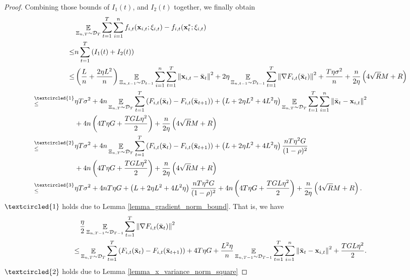 \documentclass{article}
\begin{document}
\begin{proof}
 
Combining those bounds of $I_1(t)$, and $I_2(t)$ together, we finally obtain
\begin{align}
\nonumber
& \EE_{ \Xi_{n,T} \sim \Dcal_{T} } \sum_{t=1}^T\sum_{i=1}^n f_{i,t}(\x_{i,t};\xi_{i,t}) - f_{i,t}(\x_t^\ast;\xi_{i,t}) \\ \nonumber
\le & n \sum_{t=1}^T \lrincir{ I_1(t) + I_2(t) } \\ \nonumber
\le & \lrincir{ \frac{L}{n} + \frac{2\eta L^2}{n} }\EE_{ \Xi_{n,t-1} \sim \Dcal_{t-1} }\sum_{i=1}^n\sum_{t=1}^T\lrnorm{\x_{i,t} - \bar{\x}_t }^2   + 2\eta  \EE_{ \Xi_{n,t-1} \sim \Dcal_{t-1} }\sum_{t=1}^T\lrnorm{\nabla F_{i,t}(\bar{\x}_t)}^2 + \frac{T\eta  \sigma^2}{n}   + \frac{n}{2\eta}\lrincir{ 4\sqrt{R}M + R  } \\ \nonumber
\refabovecir{\le}{\textcircled{1}} & \eta T \sigma^2 + 4n \EE_{ \Xi_{n,T} \sim \Dcal_{T} } \sum_{t=1}^T  \lrincir{F_{i,t}(\bar{\x}_t) - F_{i,t}(\bar{\x}_{t+1})}  +  \lrincir{L + 2\eta L^2  + 4L^2 \eta}  \EE_{ \Xi_{n,T} \sim \Dcal_{T} }\sum_{t=1}^T\sum_{i=1}^n \lrnorm{ \bar{\x}_t - \x_{i,t} }^2  \\ \nonumber
& + 4n \lrincir{ 4T  \eta G + \frac{TGL\eta^2}{2} }  + \frac{n}{2\eta}\lrincir{ 4\sqrt{R}M + R  }\\ \nonumber
\refabovecir{\le}{\textcircled{2}} & \eta T \sigma^2 + 4n \EE_{ \Xi_{n,T} \sim \Dcal_{T} } \sum_{t=1}^T  \lrincir{F_{i,t}(\bar{\x}_t) - F_{i,t}(\bar{\x}_{t+1})}  +  \lrincir{ L + 2\eta L^2  + 4L^2 \eta}  \frac{nT\eta^2 G }{(1-\rho)^2}  \\ \nonumber
& + 4n \lrincir{ 4T  \eta G + \frac{TGL\eta^2}{2} }  + \frac{n}{2\eta}\lrincir{ 4\sqrt{R}M + R  } \\ \nonumber
\refabovecir{\le}{\textcircled{3}} & \eta T \sigma^2 + 4n  T\eta G  + \lrincir{ L + 2\eta L^2  + 4L^2 \eta}  \frac{nT\eta^2 G }{(1-\rho)^2}  + 4n\lrincir{ 4T  \eta G + \frac{TGL\eta^2}{2} }  + \frac{n}{2\eta}\lrincir{ 4\sqrt{R}M + R  }.
\end{align}  
$\textcircled{1}$ holds due to Lemma \ref{lemma_gradient_norm_bound}. That is, we have
\begin{align}
\nonumber
& \frac{\eta}{2} \mathop{\mathbb{E}}_{ \Xi_{n,T-1} \sim \mathcal{D}_{T-1} }\sum_{t=1}^T \left\lVert\nabla F_{i,t}(\bar{{\bf x}}_t)\right\rVert^2 \\ \nonumber
\le & \mathop{\mathbb{E}}_{ \Xi_{n,T} \sim \mathcal{D}_{T} } \sum_{t=1}^T  \left( F_{i,t}(\bar{{\bf x}}_t) - F_{i,t}(\bar{{\bf x}}_{t+1}) \right) + 4T  \eta G + \frac{ L^2 \eta}{n}\mathop{\mathbb{E}}_{ \Xi_{n,T-1} \sim \mathcal{D}_{T-1} }\sum_{t=1}^T\sum_{i=1}^n \left\lVert \bar{{\bf x}}_t - {\bf x}_{i,t} \right\rVert^2 + \frac{TGL\eta^2}{2}.
\end{align} $\textcircled{2}$ holds due to Lemma \ref{lemma_x_variance_norm_square}

\end{proof}
\end{document}
